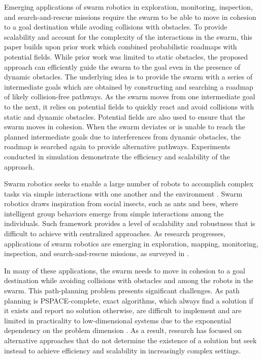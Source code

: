 \documentclass[letterpaper, 10pt, conference]{ieeeconf}
\begin{document}
Emerging applications of swarm robotics in exploration, monitoring,
inspection, and search-and-rescue missions require the swarm to be
able to move in cohesion to a goal destination while avoding
collisions with obstacles.  To provide scalability and account for the
complexity of the interactions in the swarm, this paper builds upon
prior work which combined probabilistic roadmaps with potential
fields. While prior work was limited to static obstacles, the proposed
approach can efficiently guide the swarm to the goal even in the
presence of dynamic obstacles. The underlying idea is to provide the
swarm with a series of intermediate goals which are obtained by
constructing and searching a roadmap of likely collision-free
pathways. As the swarm moves from one intermediate goal to the next,
it relies on potential fields to quickly react and avoid collisions
with static and dynamic obstacles. Potential fields are also used to
ensure that the swarm moves in cohesion. When the swarm deviates or is
unable to reach the planned intermediate goals due to interferences
from dynamic obstacles, the roadmap is searched again to provide
alternative pathways. Experiments conducted in simulation demonstrate
the efficiency and scalability of the approach.



Swarm robotics seeks to enable a large number of robots to accomplish
complex tasks via simple interactions with one another and the
environment \cite{reynolds1987flocks}.  Swarm robotics draws
inspiration from social insects, such as ants and bees, where
intelligent group behaviors emerge from simple interactions among the
individuals. Such framework provides a level of scalability and
robustness that is difficult to achieve with centralized
approaches. As research progresses, applications of swarm robotics are
emerging in exploration, mapping,
monitoring, inspection, and search-and-rescue missions, as surveyed in
\cite{swarm,swarmReview12}.

In many of these applications, the swarm needs to move in
cohesion to a goal destination while avoiding collisions with
obstacles and among the robots in the swarm. This path-planning
problem presents significant challenges. As path
planning is PSPACE-complete, exact algorithms, which always find a
solution if it exists and report no solution otherwise, are difficult
to implement and are limited in practicality to low-dimensional
systems due to the exponential dependency on the problem dimension
\cite{Rei79,Can88,SchSha88}.
As a result, research has focused on alternative approaches that do
not determine the existence of a solution but seek instead
to achieve efficiency and scalability in increasingly complex
settings.
\end{document}
